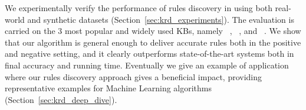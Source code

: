 We experimentally verify the performance of rules discovery in \krd using both real-world and synthetic datasets (Section~\ref{sec:krd_experiments}). The evaluation is carried on the 3 most popular and widely used KBs, namely \dbpedia~\cite{bizer2009dbpedia}, \yago~\cite{suchanek2007yago}, and \wikidata~\cite{vrandevcic2014wikidata}. We show that our algorithm is general enough to deliver accurate rules both in the positive and negative setting, and it clearly outperforms state-of-the-art systems both in final accuracy and running time. Eventually we give an example of application where our rules discovery approach gives a beneficial impact, providing representative examples for Machine Learning algorithms (Section~\ref{sec:krd_deep_dive}).